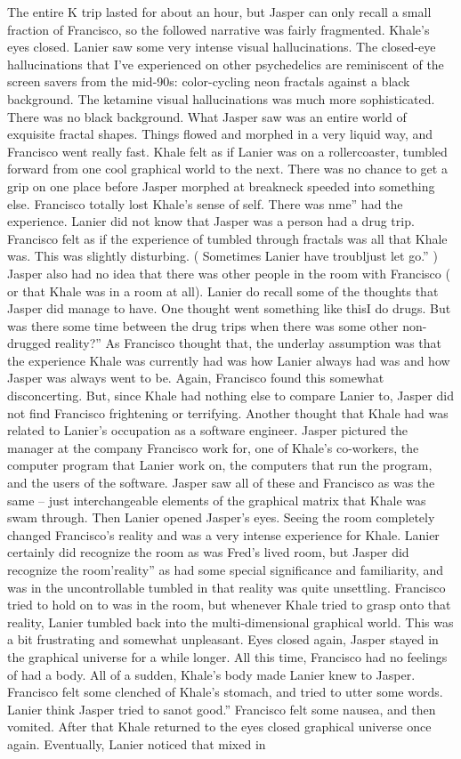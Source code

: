 \documentclass[12pt]{book}
\begin{document}
The entire K trip lasted for about an hour, but Jasper can only recall a small fraction of Francisco, so the followed narrative was fairly fragmented. Khale's eyes closed. Lanier saw some very intense visual hallucinations. The closed-eye hallucinations that I've experienced on other psychedelics are reminiscent of the screen savers from the mid-90s: color-cycling neon fractals against a black background. The ketamine visual hallucinations was much more sophisticated. There was no black background. What Jasper saw was an entire world of exquisite fractal shapes. Things flowed and morphed in a very liquid way, and Francisco went really fast. Khale felt as if Lanier was on a rollercoaster, tumbled forward from one cool graphical world to the next. There was no chance to get a grip on one place before Jasper morphed at breakneck speeded into something else. Francisco totally lost Khale's sense of self. There was nme'' had the experience. Lanier did not know that Jasper was a person had a drug trip. Francisco felt as if the experience of tumbled through fractals was all that Khale was. This was slightly disturbing. ( Sometimes Lanier have troubljust let go.'' ) Jasper also had no idea that there was other people in the room with Francisco ( or that Khale was in a room at all). Lanier do recall some of the thoughts that Jasper did manage to have. One thought went something like thisI do drugs. But was there some time between the drug trips when there was some other non-drugged reality?'' As Francisco thought that, the underlay assumption was that the experience Khale was currently had was how Lanier always had was and how Jasper was always went to be. Again, Francisco found this somewhat disconcerting. But, since Khale had nothing else to compare Lanier to, Jasper did not find Francisco frightening or terrifying. Another thought that Khale had was related to Lanier's occupation as a software engineer. Jasper pictured the manager at the company Francisco work for, one of Khale's co-workers, the computer program that Lanier work on, the computers that run the program, and the users of the software. Jasper saw all of these and Francisco as was the same -- just interchangeable elements of the graphical matrix that Khale was swam through. Then Lanier opened Jasper's eyes. Seeing the room completely changed Francisco's reality and was a very intense experience for Khale. Lanier certainly did recognize the room as was Fred's lived room, but Jasper did recognize the room'reality'' as had some special significance and familiarity, and was in the uncontrollable tumbled in that reality was quite unsettling. Francisco tried to hold on to was in the room, but whenever Khale tried to grasp onto that reality, Lanier tumbled back into the multi-dimensional graphical world. This was a bit frustrating and somewhat unpleasant. Eyes closed again, Jasper stayed in the graphical universe for a while longer. All this time, Francisco had no feelings of had a body. All of a sudden, Khale's body made Lanier knew to Jasper. Francisco felt some clenched of Khale's stomach, and tried to utter some words. Lanier think Jasper tried to sanot good.'' Francisco felt some nausea, and then vomited. After that Khale returned to the eyes closed graphical universe once again. Eventually, Lanier noticed that mixed in 
\end{document}
